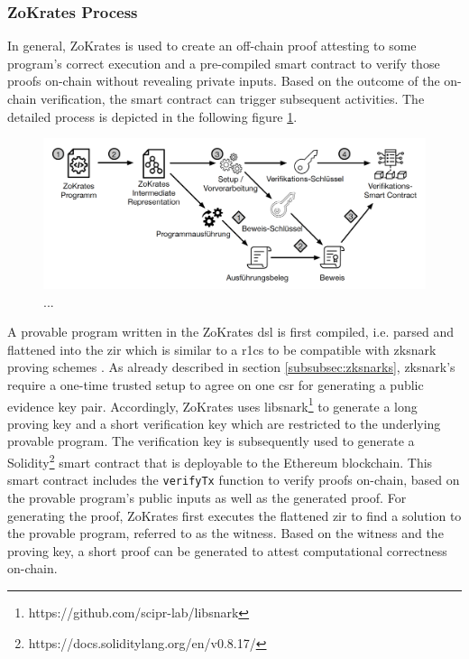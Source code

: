 
\subsubsection{ZoKrates Process}
\label{subsubsec:zkprocess}

In general, ZoKrates is used to create an off-chain proof attesting to some program's correct execution and a pre-compiled smart contract to verify those proofs on-chain without revealing private inputs. Based on the outcome of the on-chain verification, the smart contract can trigger subsequent activities. The detailed process is depicted in the following figure \ref{fig:zokrates-process}.

\begin{figure}[!htb]
    \centering
    \includegraphics[width=13cm]{images/zokrates.png}
    \caption[...]{...}
    \label{fig:zokrates-process}
\end{figure}

A provable program written in the ZoKrates \acrshort{dsl} is first compiled, i.e. parsed and flattened into the \acrfull{zir} which is similar to a \acrshort{r1cs} to be compatible with \acrshort{zksnark} proving schemes \cite{eberhardtZoKratesScalablePrivacyPreserving2018a}. As already described in section \ref{subsubsec:zksnarks}, \acrshort{zksnark}'s require a one-time trusted setup to agree on one \acrshort{csr} for generating a public evidence key pair. Accordingly, ZoKrates uses libsnark\footnote{https://github.com/scipr-lab/libsnark} to generate a long proving key and a short verification key which are restricted to the underlying provable program. The verification key is subsequently used to generate a Solidity\footnote{https://docs.soliditylang.org/en/v0.8.17/} smart contract that is deployable to the Ethereum blockchain. This smart contract includes the \texttt{verifyTx} function to verify proofs on-chain, based on the provable program's public inputs as well as the generated proof. For generating the proof, ZoKrates first executes the flattened \acrshort{zir} to find a solution to the provable program, referred to as the witness. Based on the witness and the proving key, a short proof can be generated to attest computational correctness on-chain.

